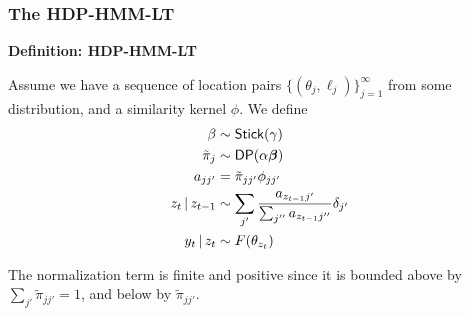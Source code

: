 \documentclass[11pt, mathserif, handout, table]{beamer}
\begin{document}
\begin{frame}
  \frametitle{The HDP-HMM-LT}
  \begin{exampleblock}{\small

      {\bf Definition: HDP-HMM-LT}

\vspace{0.2in}
    Assume we have a sequence of location pairs $\{(\theta_j, \ell_j)\}_{j=1}^\infty$ from some
    distribution, and a similarity kernel $\phi$.  We define
    \begin{align}
      \beta &\sim \mathsf{Stick}(\gamma) \\
      \tilde{\pi}_j &\sim \mathsf{DP}(\alpha\boldsymbol{\beta}) \\
      a_{jj'} &= \tilde{\pi}_{jj'} \phi_{jj'} \\
      z_t \, \vert \, z_{t-1} &\sim \sum_{j'} \frac{a_{z_{t-1}j'}}{\sum_{j''}
        a_{z_{t-1}j''}} \delta_{j'} \\
      y_t \, \vert \, z_t &\sim F(\theta_{z_t})
    \end{align}
  }
  \end{exampleblock}
  The normalization term is finite and positive since it
  is bounded above by $\sum_{j'} \tilde{\pi}_{jj'} = 1$, and below by $\tilde{\pi}_{jj'}$.
\end{frame}
\end{document}
